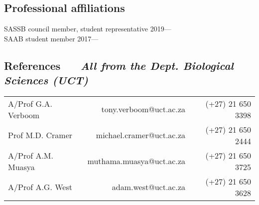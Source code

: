 \documentclass[10pt]{article}
\begin{document}
\begin{multicols}{2}

\subsection*{Professional affiliations} %

SASSB council member, student representative \hfill 2019--- \\
SAAB student member \hfill 2017---

\end{multicols}

\hrulefill
\subsection*{%
  References 
  ~~{\footnotesize \textmd{\textit{
    All from the Dept. Biological Sciences (UCT)
  }}}
}

\begin{tabular}{lrr}
A/Prof G.A. Verboom & tony.verboom@uct.ac.za   & (+27) 21 650 3398 \\
Prof M.D. Cramer    & michael.cramer@uct.ac.za & (+27) 21 650 2444 \\
A/Prof A.M. Muasya  & muthama.muasya@uct.ac.za & (+27) 21 650 3725 \\
A/Prof A.G. West    & adam.west@uct.ac.za      & (+27) 21 650 3628
\end{tabular}
\end{document}
